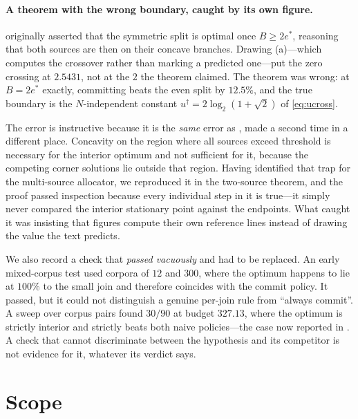 \documentclass[11pt,twocolumn,a4paper]{article}
\theoremstyle{thmstyle}
\theoremstyle{definition}
\theoremstyle{remark}
\newcommand{\estar}{e^{*}}
\newcommand{\ucross}{u^{\dagger}}
\begin{document}
\paragraph{A theorem with the wrong boundary, caught by its own figure.}
 originally asserted that the symmetric split is
optimal once $B\ge2\estar$, reasoning that both sources are then on their
concave branches. Drawing (a)---which computes the
crossover rather than marking a predicted one---put the zero crossing at
$2.5431$, not at the $2$ the theorem claimed. The theorem was wrong: at
$B=2\estar$ exactly, committing beats the even split by $12.5\%$, and the
true boundary is the $N$-independent constant
$\ucross=2\log_2(1+\sqrt2)$ of \eqref{eq:ucross}.

The error is instructive because it is the \emph{same} error as
, made a second time in a different place.
Concavity on the region where all sources exceed threshold is necessary
for the interior optimum and not sufficient for it, because the
competing corner solutions lie outside that region. Having identified
that trap for the multi-source allocator, we reproduced it in the
two-source theorem, and the proof passed inspection because every
individual step in it is true---it simply never compared the interior
stationary point against the endpoints. What caught it was insisting
that figures compute their own reference lines instead of drawing the
value the text predicts.

We also record a check that \emph{passed vacuously} and had to be
replaced. An early mixed-corpus test used corpora of $12$ and $300$,
where the optimum happens to lie at $100\%$ to the small join and
therefore coincides with the commit policy. It passed, but it could not
distinguish a genuine per-join rule from ``always commit''. A sweep over
corpus pairs found $30/90$ at budget $327.13$, where the optimum is
strictly interior and strictly beats both naive policies---the case now
reported in . A check that cannot discriminate between
the hypothesis and its competitor is not evidence for it, whatever its
verdict says.



\section{Scope}
\label{sec:scope}
\end{document}
